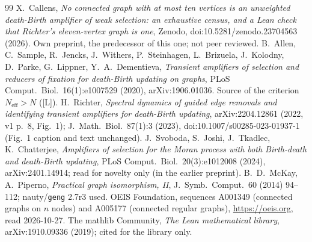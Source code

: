 \documentclass[10pt]{article}
\newcommand{\tier}[1]{\textsf{[#1]}}
\newcommand{\tL}{\tier{L}}
\newcommand{\Neff}{N_{\mathrm{eff}}}
\begin{document}
\begin{thebibliography}{99}\small
{} X.~Callens, \emph{No connected graph with at most ten vertices is an unweighted death-Birth amplifier of weak selection: an exhaustive census, and a Lean check that Richter's eleven-vertex graph is one}, Zenodo, doi:10.5281/zenodo.23704563 (2026). Own preprint, the predecessor of this one; not peer reviewed.
 B.~Allen, C.~Sample, R.~Jencks, J.~Withers, P.~Steinhagen, L.~Brizuela, J.~Kolodny, D.~Parke, G.~Lippner, Y.~A.~Dementieva, \emph{Transient amplifiers of selection and reducers of fixation for death-Birth updating on graphs}, PLoS Comput.\ Biol.\ 16(1):e1007529 (2020), arXiv:1906.01036. Source of the criterion $\Neff>N$ (\tL).
 H.~Richter, \emph{Spectral dynamics of guided edge removals and identifying transient amplifiers for death-Birth updating}, arXiv:2204.12861 (2022, v1 p.~8, Fig.~1); J.\ Math.\ Biol.\ 87(1):3 (2023), doi:10.1007/s00285-023-01937-1 (Fig.~1 caption and text unchanged).
 J.~Svoboda, S.~Joshi, J.~Tkadlec, K.~Chatterjee, \emph{Amplifiers of selection for the Moran process with both Birth-death and death-Birth updating}, PLoS Comput.\ Biol.\ 20(3):e1012008 (2024), arXiv:2401.14914; read for novelty only (in the earlier preprint).
 B.~D.~McKay, A.~Piperno, \emph{Practical graph isomorphism, II}, J.\ Symb.\ Comput.\ 60 (2014) 94--112; nauty/\texttt{geng} 2.7r3 used.
 OEIS Foundation, sequences A001349 (connected graphs on $n$ nodes) and A005177 (connected regular graphs), \url{https://oeis.org}, read 2026-10-27.
 The mathlib Community, \emph{The Lean mathematical library}, arXiv:1910.09336 (2019); cited for the library only.
\end{thebibliography}
\end{document}
